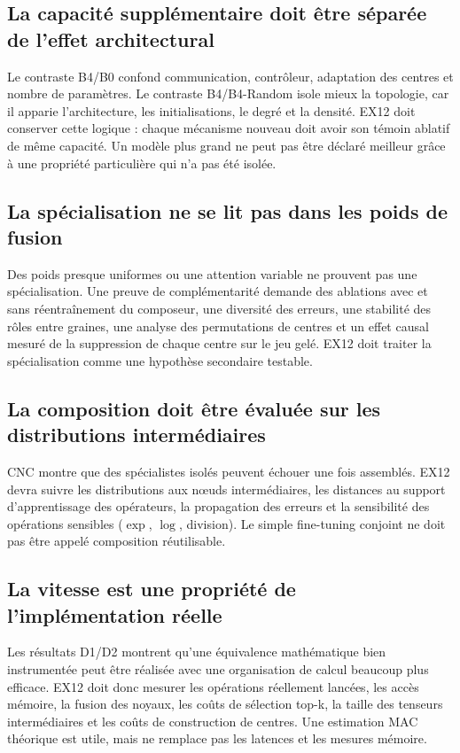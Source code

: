 \documentclass[11pt,a4paper]{article}
\begin{document}
\subsection{La capacité supplémentaire doit être séparée de l'effet architectural}

Le contraste B4/B0 confond communication, contrôleur, adaptation des centres et nombre de paramètres. Le contraste B4/B4-Random isole mieux la topologie, car il apparie l'architecture, les initialisations, le degré et la densité. EX12 doit conserver cette logique : chaque mécanisme nouveau doit avoir son témoin ablatif de même capacité. Un modèle plus grand ne peut pas être déclaré meilleur grâce à une propriété particulière qui n'a pas été isolée.

\subsection{La spécialisation ne se lit pas dans les poids de fusion}

Des poids presque uniformes ou une attention variable ne prouvent pas une spécialisation. Une preuve de complémentarité demande des ablations avec et sans réentraînement du composeur, une diversité des erreurs, une stabilité des rôles entre graines, une analyse des permutations de centres et un effet causal mesuré de la suppression de chaque centre sur le jeu gelé. EX12 doit traiter la spécialisation comme une hypothèse secondaire testable.

\subsection{La composition doit être évaluée sur les distributions intermédiaires}

CNC montre que des spécialistes isolés peuvent échouer une fois assemblés. EX12 devra suivre les distributions aux nœuds intermédiaires, les distances au support d'apprentissage des opérateurs, la propagation des erreurs et la sensibilité des opérations sensibles ($\exp$, $\log$, division). Le simple fine-tuning conjoint ne doit pas être appelé composition réutilisable.

\subsection{La vitesse est une propriété de l'implémentation réelle}

Les résultats D1/D2 montrent qu'une équivalence mathématique bien instrumentée peut être réalisée avec une organisation de calcul beaucoup plus efficace. EX12 doit donc mesurer les opérations réellement lancées, les accès mémoire, la fusion des noyaux, les coûts de sélection top-k, la taille des tenseurs intermédiaires et les coûts de construction de centres. Une estimation MAC théorique est utile, mais ne remplace pas les latences et les mesures mémoire.
\end{document}
